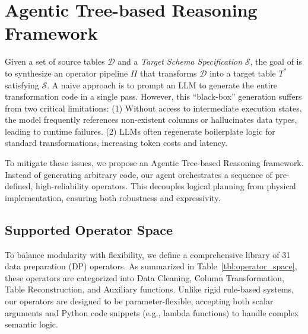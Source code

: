 \section{Agentic Tree-based Reasoning Framework}
\label{sec:tree_based_agentic_reasoning}

Given a set of source tables $\mathcal{D}$ and a \textit{Target Schema Specification} $\mathcal{S}$, the goal of \sys is to synthesize an operator pipeline $\Pi$ that transforms $\mathcal{D}$ into a target table $T^*$ satisfying $\mathcal{S}$.
A naive approach is to prompt an LLM to generate the entire transformation code in a single pass. However, this ``black-box'' generation suffers from two critical limitations: (1) Without access to intermediate execution states, the model frequently references non-existent columns or hallucinates data types, leading to runtime failures.
(2) LLMs often regenerate boilerplate logic for standard transformations, increasing token costs and latency.

To mitigate these issues, we propose an Agentic Tree-based Reasoning framework. Instead of generating arbitrary code, our agent orchestrates a sequence of pre-defined, high-reliability operators. This decouples logical planning from physical implementation, ensuring both robustness and expressivity.

\subsection{Supported Operator Space}
\label{subsec:op_space}
 


To balance modularity with flexibility, we define a comprehensive library of 31 data preparation (DP) operators. As summarized in Table~\ref{tbl:operator_space}, these operators are categorized into Data Cleaning, Column Transformation, Table Reconstruction, and Auxiliary functions.
Unlike rigid rule-based systems, our operators are designed to be parameter-flexible, accepting both scalar arguments and Python code snippets (e.g., lambda functions) to handle complex semantic logic.



